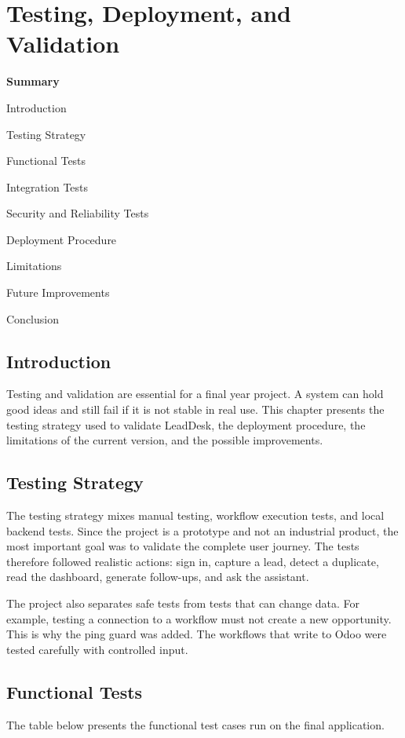 \documentclass[12pt,a4paper,oneside]{report}
\newcommand{\chsummaryitem}[3]{\noindent\makebox[1.15cm][l]{#1}#2\,\dotfill\,\pageref{#3}\par}
\begin{document}
\chapter{Testing, Deployment, and Validation}

\vspace{0.35cm}
{\Large\bfseries Summary}\par
{}\vspace{0.30cm}
{\small
\chsummaryitem{9.1}{Introduction}{sumlbl:c9s1}
\chsummaryitem{9.2}{Testing Strategy}{sumlbl:c9s2}
\chsummaryitem{9.3}{Functional Tests}{sumlbl:c9s3}
\chsummaryitem{9.4}{Integration Tests}{sumlbl:c9s4}
\chsummaryitem{9.5}{Security and Reliability Tests}{sumlbl:c9s5}
\chsummaryitem{9.6}{Deployment Procedure}{sumlbl:c9s6}
\chsummaryitem{9.7}{Limitations}{sumlbl:c9s7}
\chsummaryitem{9.8}{Future Improvements}{sumlbl:c9s8}
\chsummaryitem{9.9}{Conclusion}{sumlbl:c9s9}
}
\clearpage

\section{Introduction}\label{sumlbl:c9s1}
Testing and validation are essential for a final year project. A system can hold good ideas and still fail if it is not stable in real use. This chapter presents the testing strategy used to validate LeadDesk, the deployment procedure, the limitations of the current version, and the possible improvements.

\section{Testing Strategy}\label{sumlbl:c9s2}
The testing strategy mixes manual testing, workflow execution tests, and local backend tests. Since the project is a prototype and not an industrial product, the most important goal was to validate the complete user journey. The tests therefore followed realistic actions: sign in, capture a lead, detect a duplicate, read the dashboard, generate follow-ups, and ask the assistant.

The project also separates safe tests from tests that can change data. For example, testing a connection to a workflow must not create a new opportunity. This is why the ping guard was added. The workflows that write to Odoo were tested carefully with controlled input.

\section{Functional Tests}\label{sumlbl:c9s3}
The table below presents the functional test cases run on the final application.
\end{document}
